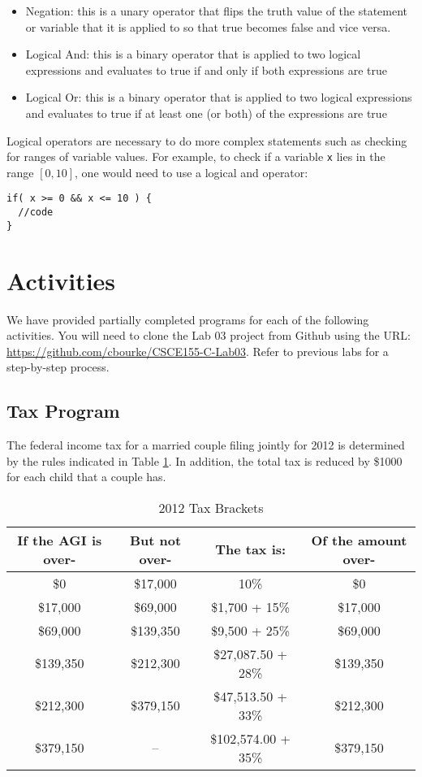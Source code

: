 \documentclass[12pt]{scrartcl}
\begin{document}
\begin{itemize}
  \item Negation: this is a unary operator that flips the truth value of 
  	the statement or variable that it is applied to so that true becomes 
	false and vice versa.
  \item Logical And: this is a binary operator that is applied to two logical 
	expressions and evaluates to true if and only if both expressions are 
	true
  \item Logical Or: this is a binary operator that is applied to two logical 
	expressions and evaluates to true if at least one (or both) of the 
	expressions are true
\end{itemize}
	
Logical operators are necessary to do more complex statements such as 
checking for ranges of variable values.  For example, to check if a variable 
\texttt{x} lies in the range $[0, 10]$, one would need to use a logical and operator:

\begin{verbatim}
if( x >= 0 && x <= 10 ) { 
  //code
}
\end{verbatim}

\section{Activities}

We have provided partially completed programs for each of the following 
activities.  You will need to clone the Lab 03 project from Github using the URL:
\url{https://github.com/cbourke/CSCE155-C-Lab03}.  Refer to previous
labs for a step-by-step process.

\subsection{Tax Program}

The federal income tax for a married couple filing jointly for 2012 is determined 
by the rules indicated in Table \ref{table:taxBrackets}.  In addition, the total tax is reduced by 
\$1000 for each child that a couple has.  

\begin{table}
\centering
\begin{tabular}{c|c|c|c}
If the AGI is over- & But not over- & The tax is: & Of the amount over- \\
\hline\hline
\$0 & \$17,000 & 10\% & \$0 \\
\$17,000 & \$69,000 & \$1,700 + 15\% & \$17,000 \\
\$69,000 & \$139,350 & \$9,500 + 25\% & \$69,000 \\
\$139,350 & \$212,300 & \$27,087.50 + 28\% & \$139,350 \\
\$212,300 & \$379,150 & \$47,513.50 + 33\% & \$212,300 \\
\$379,150 & --  & \$102,574.00 + 35\% & \$379,150 \\
\end{tabular}
\caption{2012 Tax Brackets}
\label{table:taxBrackets}
\end{table}
\end{document}
